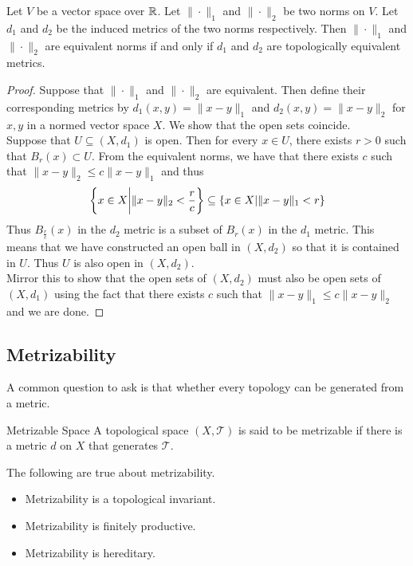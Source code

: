 \documentclass[a4paper]{article}
\begin{document}
\begin{prp}{}{} Let $V$ be a vector space over $\mathbb{R}$. Let $\|\cdot\|_1$ and $\|\cdot\|_2$ be two norms on $V$. Let $d_1$ and $d_2$ be the induced metrics of the two norms respectively. Then $\|\cdot\|_1$ and $\|\cdot\|_2$ are equivalent norms if and only if $d_1$ and $d_2$ are topologically equivalent metrics. 
\begin{proof}
Suppose that $\|\cdot\|_1$ and $\|\cdot\|_2$ are equivalent. Then define their corresponding metrics by $d_1(x,y)=\|x-y\|_1$ and $d_2(x,y)=\|x-y\|_2$ for $x,y$ in a normed vector space $X$. We show that the open sets coincide. \\
Suppose that $U\subseteq(X,d_1)$ is open. Then for every $x\in U$, there exists $r>0$ such that $B_r(x)\subset U$. From the equivalent norms, we have that there exists $c$ such that $\|x-y\|_2\leq c\|x-y\|_1$ and thus $$\left\{x\in X\bigg{|}\|x-y\|_2<\frac{r}{c}\right\}\subseteq\{x\in X|\|x-y\|_1<r\}$$ Thus $B_{\frac{r}{c}}(x)$ in the $d_2$ metric is a subset of $B_r(x)$ in the $d_1$ metric. This means that we have constructed an open ball in $(X,d_2)$ so that it is contained in $U$. Thus $U$ is also open in $(X,d_2)$. \\
Mirror this to show that the open sets of $(X,d_2)$ must also be open sets of $(X,d_1)$ using the fact that there exists $c$ such that $\|x-y\|_1\leq c\|x-y\|_2$ and we are done. 
\end{proof}
\end{prp}

\subsection{Metrizability}
A common question to ask is that whether every topology can be generated from a metric. 
\begin{defn}{Metrizable Space}{} A topological space $(X,\mathcal{T})$ is said to be metrizable if there is a metric $d$ on $X$ that generates $\mathcal{T}$. 
\end{defn}

\begin{prp}{}{} The following are true about metrizability. 
\begin{itemize}
\item Metrizability is a topological invariant. 
\item Metrizability is finitely productive. 
\item Metrizability is hereditary. 
\end{itemize}
\end{prp}
\end{document}
